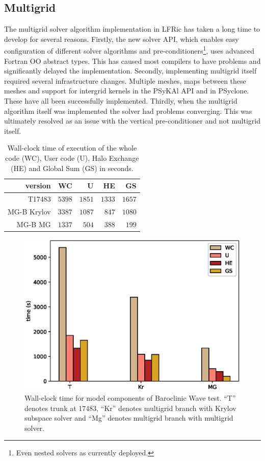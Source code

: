 \subsection{\label{sec:multigrid}Multigrid}
The multigrid solver algorithm implementation in LFRic has taken a
long time to develop for several reasons. Firstly, the new solver API,
which enables easy configuration of different solver algorithms and
pre-conditioners\footnote{Even nested solvers as currently deployed.},
uses advanced Fortran OO abstract types. This has caused most
compilers to have problems and significantly delayed the
implementation. Secondly, implementing multigrid itself required
several infrastructure changes. Multiple meshes, maps between these
meshes and support for intergrid kernels in the PSyKAl API and in
PSyclone. These have all been successfully implemented. Thirdly, when
the multigrid algorithm itself was implemented the solver had problems
converging.
This was ultimately resolved as an issue with the vertical
pre-conditioner and not multigrid itself. 

\begin{table}
\centering
\caption{\label{tab:MG_data}Wall-clock time of execution of the whole code (WC), User
  code (U), Halo Exchange (HE) and Global Sum (GS) in seconds. }
\begin{tabular}{r|rrrr}
version     & WC     & U      & HE     & GS \\\hline
T17483      & $5398$ & $1851$ & $1333$ & $1657$ \\
MG-B Krylov & $3387$ & $1087$ & $847$  & $1080$ \\
MG-B MG     & $1337$ & $504$  & $388$  & $199$ \\\hline
\end{tabular}
\end{table}

\begin{figure}[ht!]
\centering\includegraphics[width=1.0\linewidth]{figs/mg-improvement.eps}
\caption{\label{fig:mg}Wall-clock time for model components of
  Baroclinic Wave test. ``T'' denotes trunk at 17483, ``Kr'' denotes
  multigrid branch with Krylov subspace solver and ``Mg'' denotes
  multigrid branch with multigrid solver.}
\end{figure} 